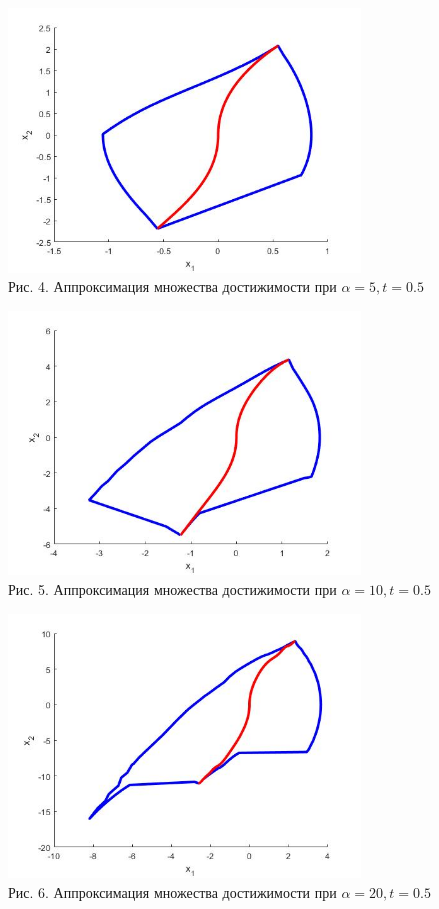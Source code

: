 \documentclass{article}
\theoremstyle{definition}
\begin{document}
	\begin{center}
		\includegraphics[width=0.7\textwidth]{example4.jpg}\\
		{Рис. 4. Аппроксимация множества достижимости при $\alpha = 5, t = 0.5$ }
	\end{center}
	\begin{center}
		\includegraphics[width=0.7\textwidth]{example5.jpg}\\
		{Рис. 5. Аппроксимация множества достижимости при $\alpha = 10, t = 0.5$ }
	\end{center}
	\begin{center}
		\includegraphics[width=0.7\textwidth]{example6.jpg}\\
		{Рис. 6. Аппроксимация множества достижимости при $\alpha = 20, t = 0.5$ }
	\end{center}
\end{document}
